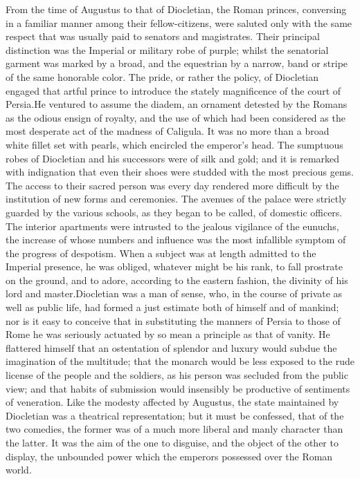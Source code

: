 From the time of Augustus to that of Diocletian, the Roman
princes, conversing in a familiar manner among their
fellow-citizens, were saluted only with the same respect that was
usually paid to senators and magistrates. Their principal
distinction was the Imperial or military robe of purple; whilst
the senatorial garment was marked by a broad, and the equestrian
by a narrow, band or stripe of the same honorable color. The
pride, or rather the policy, of Diocletian engaged that artful
prince to introduce the stately magnificence of the court of
Persia.\footnotemark[101] He ventured to assume the diadem, an ornament
detested by the Romans as the odious ensign of royalty, and the
use of which had been considered as the most desperate act of the
madness of Caligula. It was no more than a broad white fillet set
with pearls, which encircled the emperor’s head. The sumptuous
robes of Diocletian and his successors were of silk and gold; and
it is remarked with indignation that even their shoes were
studded with the most precious gems. The access to their sacred
person was every day rendered more difficult by the institution
of new forms and ceremonies. The avenues of the palace were
strictly guarded by the various schools, as they began to be
called, of domestic officers. The interior apartments were
intrusted to the jealous vigilance of the eunuchs, the increase
of whose numbers and influence was the most infallible symptom of
the progress of despotism. When a subject was at length admitted
to the Imperial presence, he was obliged, whatever might be his
rank, to fall prostrate on the ground, and to adore, according to
the eastern fashion, the divinity of his lord and master.\footnotemark[102]
Diocletian was a man of sense, who, in the course of private as
well as public life, had formed a just estimate both of himself
and of mankind; nor is it easy to conceive that in substituting
the manners of Persia to those of Rome he was seriously actuated
by so mean a principle as that of vanity. He flattered himself
that an ostentation of splendor and luxury would subdue the
imagination of the multitude; that the monarch would be less
exposed to the rude license of the people and the soldiers, as
his person was secluded from the public view; and that habits of
submission would insensibly be productive of sentiments of
veneration. Like the modesty affected by Augustus, the state
maintained by Diocletian was a theatrical representation; but it
must be confessed, that of the two comedies, the former was of a
much more liberal and manly character than the latter. It was the
aim of the one to disguise, and the object of the other to
display, the unbounded power which the emperors possessed over
the Roman world.

